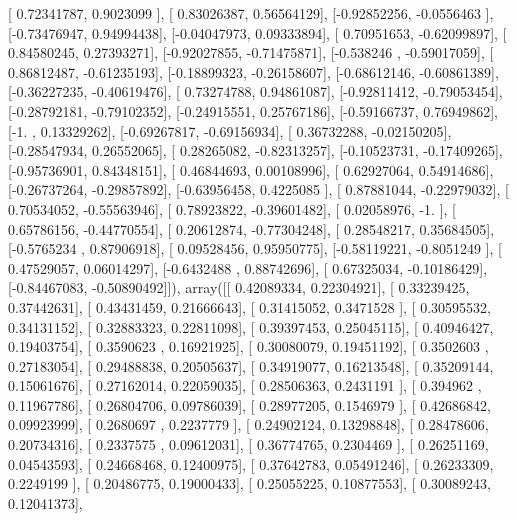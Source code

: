 \documentclass{article}
\begin{document}
       [ 0.72341787,  0.9023099 ],
       [ 0.83026387,  0.56564129],
       [-0.92852256, -0.0556463 ],
       [-0.73476947,  0.94994438],
       [-0.04047973,  0.09333894],
       [ 0.70951653, -0.62099897],
       [ 0.84580245,  0.27393271],
       [-0.92027855, -0.71475871],
       [-0.538246  , -0.59017059],
       [ 0.86812487, -0.61235193],
       [-0.18899323, -0.26158607],
       [-0.68612146, -0.60861389],
       [-0.36227235, -0.40619476],
       [ 0.73274788,  0.94861087],
       [-0.92811412, -0.79053454],
       [-0.28792181, -0.79102352],
       [-0.24915551,  0.25767186],
       [-0.59166737,  0.76949862],
       [-1.        ,  0.13329262],
       [-0.69267817, -0.69156934],
       [ 0.36732288, -0.02150205],
       [-0.28547934,  0.26552065],
       [ 0.28265082, -0.82313257],
       [-0.10523731, -0.17409265],
       [-0.95736901,  0.84348151],
       [ 0.46844693,  0.00108996],
       [ 0.62927064,  0.54914686],
       [-0.26737264, -0.29857892],
       [-0.63956458,  0.4225085 ],
       [ 0.87881044, -0.22979032],
       [ 0.70534052, -0.55563946],
       [ 0.78923822, -0.39601482],
       [ 0.02058976, -1.        ],
       [ 0.65786156, -0.44770554],
       [ 0.20612874, -0.77304248],
       [ 0.28548217,  0.35684505],
       [-0.5765234 ,  0.87906918],
       [ 0.09528456,  0.95950775],
       [-0.58119221, -0.8051249 ],
       [ 0.47529057,  0.06014297],
       [-0.6432488 ,  0.88742696],
       [ 0.67325034, -0.10186429],
       [-0.84467083, -0.50890492]]), array([[ 0.42089334,  0.22304921],
       [ 0.33239425,  0.37442631],
       [ 0.43431459,  0.21666643],
       [ 0.31415052,  0.3471528 ],
       [ 0.30595532,  0.34131152],
       [ 0.32883323,  0.22811098],
       [ 0.39397453,  0.25045115],
       [ 0.40946427,  0.19403754],
       [ 0.3590623 ,  0.16921925],
       [ 0.30080079,  0.19451192],
       [ 0.3502603 ,  0.27183054],
       [ 0.29488838,  0.20505637],
       [ 0.34919077,  0.16213548],
       [ 0.35209144,  0.15061676],
       [ 0.27162014,  0.22059035],
       [ 0.28506363,  0.2431191 ],
       [ 0.394962  ,  0.11967786],
       [ 0.26804706,  0.09786039],
       [ 0.28977205,  0.1546979 ],
       [ 0.42686842,  0.09923999],
       [ 0.2680697 ,  0.2237779 ],
       [ 0.24902124,  0.13298848],
       [ 0.28478606,  0.20734316],
       [ 0.2337575 ,  0.09612031],
       [ 0.36774765,  0.2304469 ],
       [ 0.26251169,  0.04543593],
       [ 0.24668468,  0.12400975],
       [ 0.37642783,  0.05491246],
       [ 0.26233309,  0.2249199 ],
       [ 0.20486775,  0.19000433],
       [ 0.25055225,  0.10877553],
       [ 0.30089243,  0.12041373],
\end{document}
